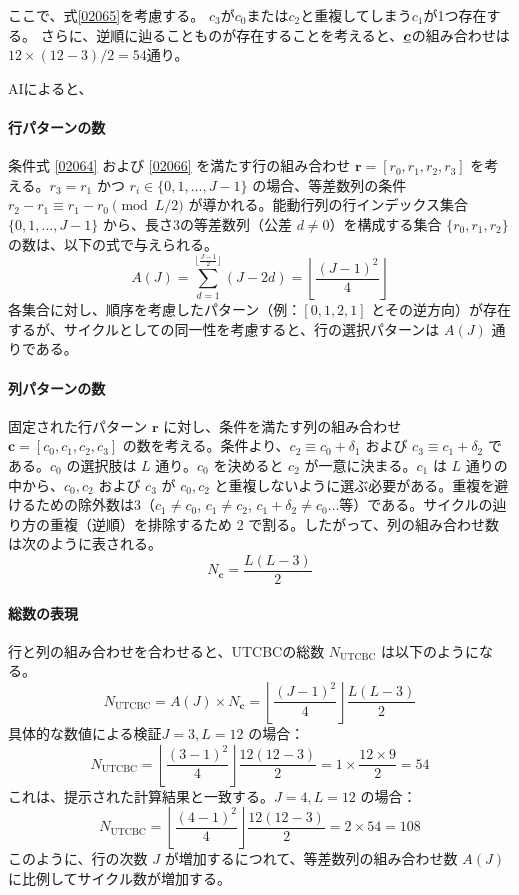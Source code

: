 \documentclass[a4paper,11pt,dvipdfmx]{jsarticle}
\theoremstyle{definition}
\begin{document}
ここで、式\eqref{02065}を考慮する。
$c_3$が$c_0$または$c_2$と重複してしまう$c_1$が1つ存在する。
さらに、逆順に辿ることものが存在することを考えると、$\underline{\bm{c}}$の組み合わせは
$12\times (12-3)/2 = 54$通り。

AIによると、
\paragraph{行パターンの数}
条件式 \eqref{02064} および \eqref{02066} を満たす行の組み合わせ $\mathbf{r} = [r_0, r_1, r_2, r_3]$ を考える。$r_3 = r_1$ かつ $r_i \in \{0, 1, \dots, J-1\}$ の場合、等差数列の条件 $r_2 - r_1 \equiv r_1 - r_0 \pmod{L/2}$ が導かれる。能動行列の行インデックス集合 $\{0, 1, \dots, J-1\}$ から、長さ3の等差数列（公差 $d \neq 0$）を構成する集合 $\{r_0, r_1, r_2\}$ の数は、以下の式で与えられる。$$A(J) = \sum_{d=1}^{\lfloor \frac{J-1}{2} \rfloor} (J - 2d) = \left\lfloor \frac{(J-1)^2}{4} \right\rfloor$$各集合に対し、順序を考慮したパターン（例：$[0,1,2,1]$ とその逆方向）が存在するが、サイクルとしての同一性を考慮すると、行の選択パターンは $A(J)$ 通りである。
\paragraph{列パターンの数}
固定された行パターン $\mathbf{r}$ に対し、条件を満たす列の組み合わせ $\mathbf{c} = [c_0, c_1, c_2, c_3]$ の数を考える。条件より、$c_2 \equiv c_0 + \delta_1$ および $c_3 \equiv c_1 + \delta_2$ である。$c_0$ の選択肢は $L$ 通り。$c_0$ を決めると $c_2$ が一意に決まる。$c_1$ は $L$ 通りの中から、$c_0, c_2$ および $c_3$ が $c_0, c_2$ と重複しないように選ぶ必要がある。重複を避けるための除外数は3（$c_1 \neq c_0$, $c_1 \neq c_2$, $c_1 + \delta_2 \neq c_0 \dots$等）である。サイクルの辿り方の重複（逆順）を排除するため 2 で割る。したがって、列の組み合わせ数は次のように表される。$$N_{\mathbf{c}} = \frac{L(L-3)}{2}$$
\paragraph{総数の表現}
行と列の組み合わせを合わせると、UTCBCの総数 $N_{\text{UTCBC}}$ は以下のようになる。$$N_{\text{UTCBC}} = A(J) \times N_{\mathbf{c}} = \left\lfloor \frac{(J-1)^2}{4} \right\rfloor \frac{L(L-3)}{2}$$具体的な数値による検証$J=3, L=12$ の場合：$$N_{\text{UTCBC}} = \left\lfloor \frac{(3-1)^2}{4} \right\rfloor \frac{12(12-3)}{2} = 1 \times \frac{12 \times 9}{2} = 54$$これは、提示された計算結果と一致する。$J=4, L=12$ の場合：$$N_{\text{UTCBC}} = \left\lfloor \frac{(4-1)^2}{4} \right\rfloor \frac{12(12-3)}{2} = 2 \times 54 = 108$$このように、行の次数 $J$ が増加するにつれて、等差数列の組み合わせ数 $A(J)$ に比例してサイクル数が増加する。
\end{document}
